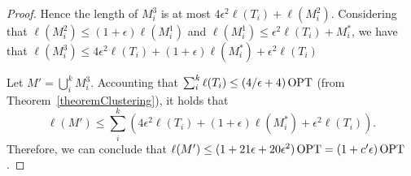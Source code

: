 \begin{proof}
    Hence the length of \(M_i^3\) is at most \(4 \epsilon^2 \ell(T_i) + \ell(M_i^2)\). Considering that \(\ell(M_i^2) \leq (1 + \epsilon) \ell(M_i^1)\) and \(\ell(M_i^1) \leq \epsilon^2 \ell(T_i) + M^\ast_i\), we have that \(\ell(M_i^3) \leq 4 \epsilon^2 \ell(T_i) + (1 + \epsilon) \ell(M^\ast_i)  + \epsilon^2 \ell(T_i)\)

    Let \(M' = \bigcup_i^k M_i^3\). Accounting that \(\sum_i^k \ell(T_i) \leq (4/\epsilon + 4) \operatorname{\textrm{OPT}}\) (from Theorem~\ref{theoremClustering}), it holds that \[\ell(M') \leq \sum_i^k \left ( 4 \epsilon^2 \ell(T_i) + (1 + \epsilon) \ell(M^\ast_i)  + \epsilon^2 \ell(T_i) \right).\] 
    Therefore, we can conclude that  \(\ell(M') \leq (1 + 21 \epsilon + 20 \epsilon^2) \operatorname{\textrm{OPT}} = (1 + c'\epsilon) \operatorname{\textrm{OPT}}\).
\end{proof}
